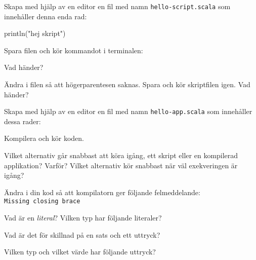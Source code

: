 \Task Skapa med hjälp av en editor en fil med namn \texttt{hello-script.scala} som innehåller denna enda rad:
\begin{Code}
println("hej skript")
\end{Code}
Spara filen och kör kommandot  i terminalen:

\Subtask Vad händer?

\Subtask Ändra i filen så att högerparentesen saknas. Spara och kör skriptfilen igen. Vad händer?

\Task Skapa med hjälp av en editor en fil med namn \texttt{hello-app.scala} som innehåller dessa rader:



\noindent Kompilera och kör koden.

\Subtask\Pen Vilket alternativ går snabbast att köra igång, ett skript eller en kompilerad applikation? Varför? Vilket alternativ kör snabbast när väl exekveringen är igång?

\Subtask Ändra i din kod så att kompilatorn ger följande felmeddelande: \\
\texttt{Missing closing brace}


\Task Vad är en \textit{literal}? Vilken typ har följande literaler?

\Subtask {} 

\Subtask {}

\Subtask {}

\Subtask {}

\Subtask {}

\Subtask {}

\Subtask {}

\Subtask {}


\Task\Pen Vad är det för skillnad på en sats och ett uttryck?

\Task Vilken typ och vilket värde har följande uttryck? 

\Subtask {}

\Subtask {}

\Subtask {}

\Subtask {}

